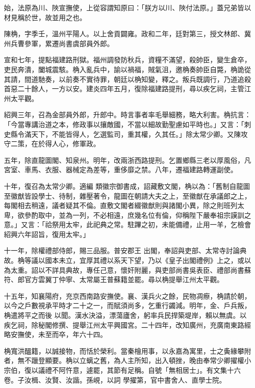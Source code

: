 \begin{pinyinscope}
 始，法原為川、陜宣撫使，上從容謂知原曰：「朕方以川、陜付法原。」蓋兄弟皆以材見稱於世，故並用之也。



 陳桷，字季壬，溫州平陽人。以上舍貢闢雍。政和二年，廷對第三，授文林郎、冀州兵曹參軍，累遷尚書虞部員外郎。



 宣和七年，提點福建路刑獄。福州調發防秋兵，資糧不滿望，殺帥臣，變生倉卒，吏民奔潰，闔城震駭。桷入亂兵中，諭以禍福，賊氣沮，邀桷奏帥臣自斃，桷詭從其請，間道馳奏，以前奏不實待罪，朝廷以桷知變，釋之。叛兵既調行，乃道追殺首惡二十餘人，一方以安。建炎四年五月，復除福建路提刑，尋以疾乞祠，主管江州太平觀。



 紹興三年，召為金部員外郎，升郎中。時言事者率毛舉細務，略大利害。桷抗言：「今當專講治道之本，修政事以攘敵國，不當以細故勤聖慮如平時也。」又言：「刺史縣令滿天下，不能皆得人，乞選監司，重其權，久其任。」除太常少卿。又陳攻守二策，在於得人心，修軍政。



 五年，除直龍圖閣、知泉州。明年，改兩浙西路提刑。乞置鄉縣三老以厚風俗，凡宮室、車馬、衣服、器械定為差等，重侈靡之禁。八年，遷福建路轉運副使。



 十年，復召為太常少卿。適編
 類徽宗御書成，詔藏敷文閣，桷以為：「舊制自龍圖至徽猷皆設學士、待制，雜壓著令，龍圖在朝請大夫之上，至徽猷在承議郎之上，每閣相去稍遠，議者疑其不倫。直敷文閣者綴徽猷則與諸閣小異，除之則班列太卑，欲參酌取中，並為一列，不必相遠，庶幾名位有倫，仰稱陛下嚴奉祖宗謨訓之意。」又言：「祫祭用太牢，此祀典之常。駐蹕之初，未能備禮，止用一羊，乞檢會紹興六年詔旨，復用太牢。」



 十一年，除權禮部侍郎，賜三品服。普安郡王
 出閣，奉詔與吏部、太常寺討論典故。桷等議以國本未立，宜厚其禮以系天下望，乃以《皇子出閣禮例》上之，或以為太重。詔以不詳具典故，專任己意，懷奸附麗，與吏部尚書吳表臣、禮部尚書蘇符、郎官方雲翼丁仲寧、太常屬王普蘇籍並罷。尋以桷提舉江州太平觀。



 十五年，知襄陽府，充京西南路安撫使。襄、漢兵火之餘，民物凋瘵，桷請於朝，以今之戶數視承平時才二十之一，而賦須尚多，乞重行蠲減。明年，金、戶兵叛，桷遣將平之而後
 以聞。漢水決溢，漂蕩廬舍，躬率兵民捍築堤岸，賴以無虞。以疾乞祠，除秘閣修撰、提舉江州太平興國宮。二十四年，改知廣州，充廣南東路經略安撫使，未至而卒，年六十四。



 桷寬洪醞籍，以誠接物，而恬於榮利。當秦檜用事，以永嘉為寓里，士之夤緣攀附者，無不躐登顯要。桷以立螭之舊，為人主所知，出入頓挫，晚由奉常少卿擢權小宗伯，復以議禮不阿忤意，遽罷，其節有足稱。自號「無相居士」。有文集十六卷。子汝楫、汝賢、汝諧。孫峴，以詞
 學擢第，官中書舍人、直學士院。




\end{pinyinscope}
